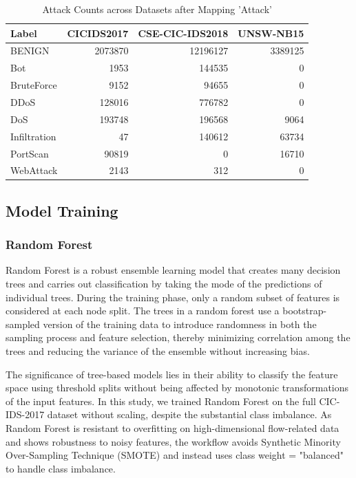 \begin{table}[!ht]
\centering
\caption{Attack Counts across Datasets after Mapping 'Attack'}
\label{tab:attack_counts after mapping}
\begin{tabular}{lrrr}
\hline
\textbf{Label} & \textbf{CICIDS2017} & 
\textbf{CSE-CIC-IDS2018} & \textbf{UNSW-NB15} \\
\hline
BENIGN        & 2073870 & 12196127 & 3389125 \\
Bot           & 1953    & 144535   & 0       \\
BruteForce    & 9152    & 94655    & 0       \\
DDoS          & 128016  & 776782   & 0       \\
DoS           & 193748  & 196568   & 9064    \\
Infiltration  & 47      & 140612   & 63734   \\
PortScan      & 90819   & 0        & 16710   \\
WebAttack     & 2143    & 312      & 0       \\
\hline
\end{tabular}
\end{table}


\subsection{Model Training}
\subsubsection{Random Forest}
Random Forest is a robust ensemble learning model that creates many decision trees and carries out classification by taking the mode of the 
predictions of individual trees. During the training phase, only a random subset of features is considered at each node split. The trees in 
a random forest use a bootstrap-sampled version of the training data to introduce randomness in both the sampling process and feature selection, 
thereby minimizing correlation among the trees and reducing the variance of the ensemble without increasing bias.

The significance of tree-based models lies in their ability to classify the feature space using threshold splits without being affected by 
monotonic transformations of the input features. In this study, we trained Random Forest on the full CIC-IDS-2017 dataset without scaling, 
despite the substantial class imbalance. As Random Forest is resistant to overfitting on high-dimensional flow-related data and shows robustness 
to noisy features, the workflow avoids Synthetic Minority Over-Sampling Technique (SMOTE) and instead uses class weight = "balanced" to 
handle class imbalance. \par

